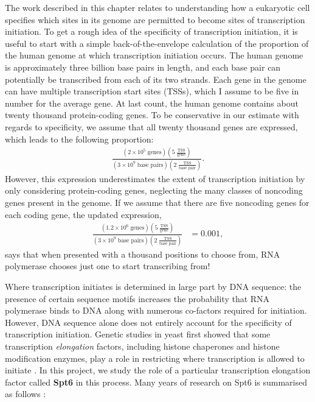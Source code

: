 The work described in this chapter relates to understanding how a eukaryotic cell specifies which sites in its genome are permitted to become sites of transcription initiation.
To get a rough idea of the specificity of transcription initiation, it is useful to start with a simple back-of-the-envelope calculation of the proportion of the human genome at which transcription initiation occurs.
The human genome is approximately three billion base pairs in length, and each base pair can potentially be transcribed from each of its two strands.
Each gene in the genome can have multiple transcription start sites (TSSs), which I assume to be five in number for the average gene.
At last count, the human genome contains about twenty thousand protein-coding genes.
To be conservative in our estimate with regards to specificity, we assume that all twenty thousand genes are expressed, which leads to the following proportion:
\begin{align*}
    \frac{\left(2 \times 10^5 \; \text{genes}\right) \left(5 \; \frac{\text{TSS}}{\text{gene}} \right)}
         {\left(3 \times 10^9 \; \text{base pairs} \right) \left(2 \; \frac{\text{TSS}}{\text{base pair}} \right)}.
\end{align*}
However, this expression underestimates the extent of transcription initiation by only considering protein-coding genes, neglecting the many classes of noncoding genes present in the genome.
If we assume that there are five noncoding genes for each coding gene, the updated expression,
\begin{align*}
    \frac{\left(1.2 \times 10^6 \; \text{genes}\right) \left(5 \; \frac{\text{TSS}}{\text{gene}} \right)}
         {\left(3 \times 10^9 \; \text{base pairs} \right) \left(2 \; \frac{\text{TSS}}{\text{base pair}} \right)}
    &= 0.001,
\end{align*}
says that when presented with a thousand positions to choose from, RNA polymerase chooses just one to start transcribing from!

Where transcription initiates is determined in large part by DNA sequence: the presence of certain sequence motifs increases the probability that RNA polymerase binds to DNA along with numerous co-factors required for initiation.
However, DNA sequence alone does not entirely account for the specificity of transcription initiation.
Genetic studies in yeast first showed that some transcription \textit{elongation} factors, including histone chaperones and histone modification enzymes, play a role in restricting where transcription is allowed to initiate \citep{kaplan2003, cheung2008, hennig2013}.
In this project, we study the role of a particular transcription elongation factor called \textbf{Spt6} in this process.
Many years of research on Spt6 is summarised as follows \citep{doris2018}:

